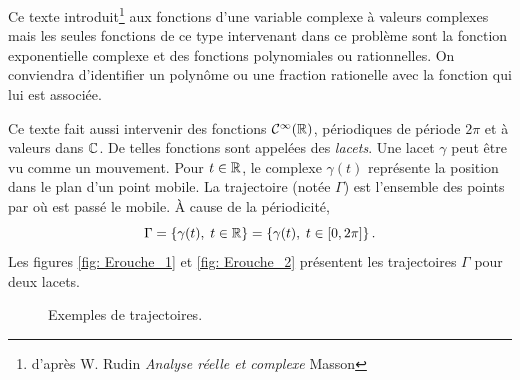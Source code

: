 Ce texte introduit\footnote{d'après W. Rudin \emph{Analyse réelle et complexe} Masson} aux fonctions d'une variable complexe à valeurs complexes mais les seules fonctions de ce type intervenant dans ce problème sont la fonction exponentielle complexe et des fonctions polynomiales ou rationnelles. On conviendra d'identifier un polynôme ou une fraction rationelle avec la fonction qui lui est associée. 

Ce texte fait aussi intervenir des fonctions $\mathcal{C}^{\infty}(\mathbb{R})$, périodiques de période $2\pi$ et à valeurs dans $\mathbb{C}$. De telles fonctions sont appelées des \emph{lacets}. Une lacet $\gamma$ peut être vu comme un mouvement. Pour $t\in \mathbb{R}$, le complexe $\gamma(t)$ représente la position dans le plan d'un point mobile. La trajectoire (notée $\Gamma$) est l'ensemble des points par où est passé le mobile. \`A cause de la périodicité,
\[
 \Gamma = \left\lbrace \gamma(t), \; t\in \mathbb{R} \right\rbrace = \left\lbrace \gamma(t), \; t\in [0, 2\pi] \right\rbrace .
\]
Les figures \ref{fig: Erouche_1} et \ref{fig: Erouche_2} présentent les trajectoires $\Gamma$ pour deux lacets.
\begin{figure}[h]
  \centering
  \hspace{3cm}
  \caption{Exemples de trajectoires.}
\end{figure}


